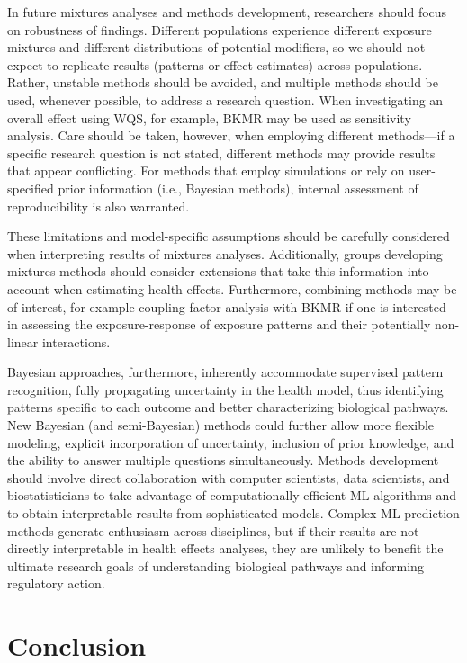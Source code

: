 In future mixtures analyses and methods development, researchers should focus on robustness of findings. Different populations experience different exposure mixtures and different distributions of potential modifiers, so we should not expect to replicate results (patterns or effect estimates) across populations. Rather, unstable methods should be avoided, and multiple methods should be used, whenever possible, to address a research question. When investigating an overall effect using WQS, for example, BKMR may be used as sensitivity analysis. Care should be taken, however, when employing different methods---if a specific research question is not stated, different methods may provide results that appear conflicting. For methods that employ simulations or rely on user-specified prior information (i.e., Bayesian methods), internal assessment of reproducibility is also warranted. 

These limitations and model-specific assumptions should be carefully considered when interpreting results of mixtures analyses. Additionally, groups developing mixtures methods should consider extensions that take this information into account when estimating health effects. Furthermore, combining methods may be of interest, for example coupling factor analysis with BKMR if one is interested in assessing the exposure-response of exposure patterns and their potentially non-linear interactions. 

Bayesian approaches, furthermore, inherently accommodate supervised pattern recognition, fully propagating uncertainty in the health model, thus identifying patterns specific to each outcome and better characterizing biological pathways. New Bayesian (and semi-Bayesian) methods could further allow more flexible modeling, explicit incorporation of uncertainty, inclusion of prior knowledge, and the ability to answer multiple questions simultaneously. Methods development should involve direct collaboration with computer scientists, data scientists, and biostatisticians to take advantage of computationally efficient ML algorithms and to obtain interpretable results from sophisticated models. Complex ML prediction methods generate enthusiasm across disciplines, but if their results are not directly interpretable in health effects analyses, they are unlikely to benefit the ultimate research goals of understanding biological pathways and informing regulatory action.

\section{Conclusion}\label{sec:Con}

